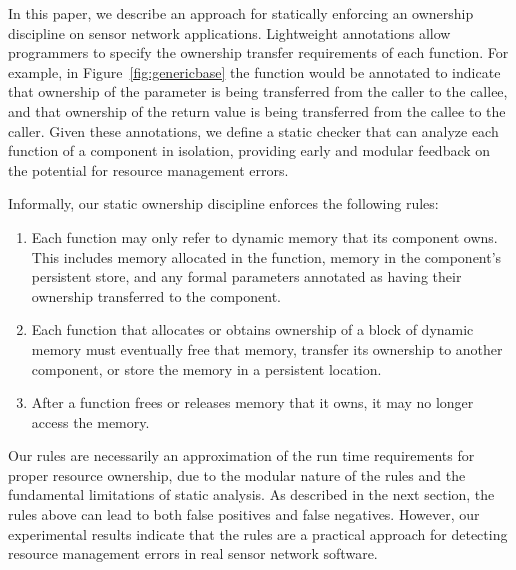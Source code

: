 
%

In this paper, we describe an approach for statically enforcing an
ownership discipline on sensor network applications.  
Lightweight annotations allow programmers to specify the ownership
transfer requirements of each function.  For example, in
Figure~\ref{fig:genericbase} the  function would be
annotated to indicate that ownership of the  parameter
is being transferred from the caller to the callee, and that ownership
of the return value is being transferred from the callee to the
caller.  Given these annotations, we define a static checker that can
analyze each function of a component in isolation, providing early and
modular feedback on the potential for resource management errors.

Informally, our
static ownership discipline enforces the following rules:
%
\begin{enumerate}
%
\item Each function may only refer to dynamic memory that its component owns.
This includes memory allocated in the function, memory in the
component's persistent store, and any formal parameters
annotated as having their ownership transferred to the component.
%
\item Each function that allocates or obtains ownership of a block of
dynamic memory must eventually free that memory, transfer its
ownership to another component, or store the memory in a persistent
location.
%
\item After a function frees or releases memory that it owns, it may
no longer access the memory.
%
\end{enumerate}




Our rules are necessarily an approximation of the run time
requirements for proper resource ownership, due to the modular nature
of the rules and the fundamental limitations of static analysis.  
As described in the next
section, the rules above can lead to both false positives and false
negatives.  However, our experimental results indicate that the rules
are a practical approach for detecting resource management errors in
real sensor network software.


